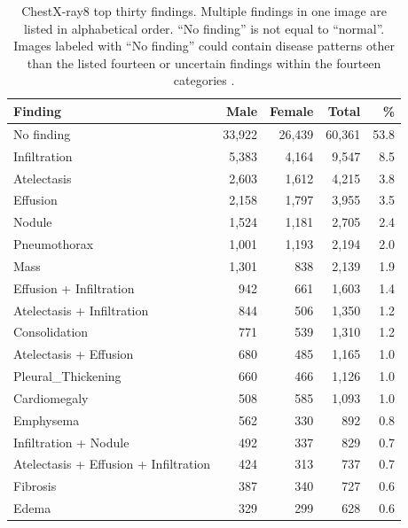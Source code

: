 \begin{singlespace}
{\begin{table}[h!]
\small
\centering
\caption[ChestX-ray8 top thirty findings.]{ChestX-ray8 top thirty findings. Multiple findings in one image are listed in alphabetical order. ``No finding'' is not equal to ``normal''.  Images labeled with ``No finding'' could contain disease patterns other than the listed fourteen or uncertain findings within the fourteen categories \cite{HealthClinicalCenter2017}.}
\label{tab:chestX-ray8-diseases-breakdown}
\begin{adjustbox}{width = 0.6\textwidth}
\begin{tabular}{lrrrr}
Finding & Male & Female & Total & \% \\
\midrule
No finding              & 33,922 & 26,439 & 60,361 & 53.8   \\
Infiltration            & 5,383  & 4,164  & 9,547  & 8.5    \\
Atelectasis             & 2,603  & 1,612  & 4,215  & 3.8    \\
Effusion                & 2,158  & 1,797  & 3,955  & 3.5    \\ \midrule[0.1pt]
Nodule                  & 1,524  & 1,181  & 2,705  & 2.4    \\
Pneumothorax            & 1,001  & 1,193  & 2,194  & 2.0    \\
Mass                    & 1,301  & 838   & 2,139  & 1.9    \\
Effusion + Infiltration   & 942   & 661   & 1,603  & 1.4    \\ \midrule[0.1pt]
Atelectasis + Infiltration & 844   & 506   & 1,350  & 1.2    \\
Consolidation           & 771   & 539   & 1,310  & 1.2    \\
Atelectasis + Effusion    & 680   & 485   & 1,165  & 1.0    \\
Pleural\_Thickening     & 660   & 466   & 1,126  & 1.0    \\ \midrule[0.1pt]
Cardiomegaly            & 508   & 585   & 1,093  & 1.0    \\
Emphysema               & 562   & 330   & 892   & 0.8    \\
Infiltration + Nodule     & 492   & 337   & 829   & 0.7    \\
Atelectasis + Effusion + Infiltration     & 424   & 313   & 737   & 0.7    \\ \midrule[0.1pt]
Fibrosis                & 387   & 340   & 727   & 0.6    \\
Edema                   & 329     & 299   & 628   & 0.6    \\

\end{tabular}
\end{adjustbox}
\end{table}}
\end{singlespace}
